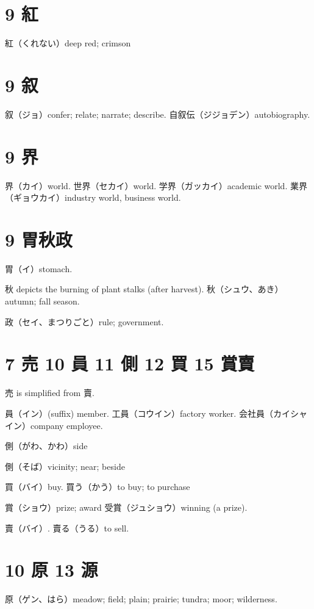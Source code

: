 \section{9 紅}

紅（くれない）deep red; crimson

\section{9 叙}

叙（ジョ）confer; relate; narrate; describe.
自叙伝（ジジョデン）autobiography.

\section{9 界}

界（カイ）world.
世界（セカイ）world.
学界（ガッカイ）academic world.
業界（ギョウカイ）industry world, business world.

\section{9 胃秋政}

胃（イ）stomach.

秋 depicts the burning of plant stalks (after harvest).
秋（シュウ、あき）autumn; fall season.

政（セイ、まつりごと）rule; government.

\section{7 売 10 員 11 側 12 買 15 賞賣}

売 is simplified from 賣.

員（イン）(suffix) member.
工員（コウイン）factory worker.
会社員（カイシャイン）company employee.

側（がわ、かわ）side

側（そば）vicinity; near; beside

買（バイ）buy.
買う（かう）to buy; to purchase

賞（ショウ）prize; award
受賞（ジュショウ）winning (a prize).

賣（バイ）.
賣る（うる）to sell.

\section{10 原 13 源}

原（ゲン、はら）meadow; field; plain; prairie; tundra; moor; wilderness.

